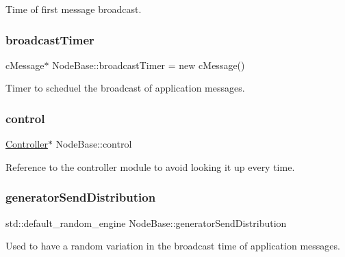Time of first message broadcast. 

\mbox{\label{class_node_base_a8b7bd31bf2bef92de75a2b565c42fd8a}} 
\subsubsection{\texorpdfstring{broadcast\+Timer}{broadcastTimer}}
{\footnotesize\ttfamily c\+Message$\ast$ Node\+Base\+::broadcast\+Timer = new c\+Message()\hspace{0.3cm}{\ttfamily [protected]}}



Timer to scheduel the broadcast of application messages. 

\mbox{\label{class_node_base_a89bfb79efc25d9508eb15a4184558c41}} 
\subsubsection{\texorpdfstring{control}{control}}
{\footnotesize\ttfamily \hyperlink{class_controller}{Controller}$\ast$ Node\+Base\+::control\hspace{0.3cm}{\ttfamily [protected]}}



Reference to the controller module to avoid looking it up every time. 

\mbox{\label{class_node_base_a2c488fd8adf4d208593a6e6eba4d6220}} 
\subsubsection{\texorpdfstring{generator\+Send\+Distribution}{generatorSendDistribution}}
{\footnotesize\ttfamily std\+::default\+\_\+random\+\_\+engine Node\+Base\+::generator\+Send\+Distribution\hspace{0.3cm}{\ttfamily [protected]}}



Used to have a random variation in the broadcast time of application messages. 

